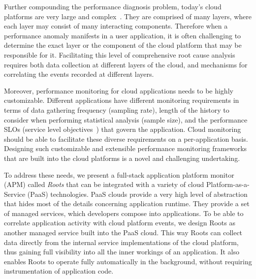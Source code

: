 %

Further compounding the performance
diagnosis problem, today's cloud platforms are very 
large and complex~\cite{DaCunhaRodrigues:2016:MCC:2851613.2851619,Ibidunmoye:2015:PAD:2808687.2791120}. 
They are
comprised of many layers, where each layer may consist of many interacting components.
Therefore when a performance anomaly manifests in a user application, it is
often challenging
to determine the exact layer or the component of the cloud platform that may be responsible for it. 
Facilitating this level of comprehensive root cause analysis requires
both data collection at different layers of the cloud, and mechanisms for correlating 
the events recorded at different layers. 
%
%

Moreover, performance monitoring for cloud applications needs to be highly customizable. Different
applications have different monitoring requirements in terms of data gathering frequency (sampling rate), 
length of the history to consider when performing statistical analysis (sample size), and the performance 
SLOs (service level objectives~\cite{Keller:2003:WFS:635430.635442}) that govern the application.
Cloud monitoring should be able to facilitate these diverse requirements on a
per-application basis.
Designing such customizable and extensible performance
monitoring frameworks that are built into the cloud platforms is a novel and challenging undertaking.

To address these needs, we present a full-stack application platform 
monitor (APM) called \textit{Roots} that can be integrated
with a variety of cloud Platform-as-a-Service (PaaS) technologies. 
PaaS clouds provide a very high level of abstraction that hides most of the details concerning application
runtime. They provide a set of managed services, which developers compose into applications.
To be able to correlate application activity with cloud platform events,
we design Roots as another managed service built into the PaaS cloud. 
This way Roots can collect data
directly from the internal service implementations of the cloud platform, thus gaining full visibility into all the 
inner workings of an application. It also enables Roots to operate fully automatically in the background, without
requiring instrumentation of application code. 

